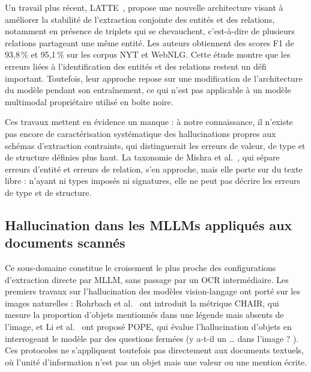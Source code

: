 Un travail plus récent, LATTE~\cite{zhang2026latte}, propose une nouvelle architecture visant à améliorer la stabilité de l'extraction conjointe des entités et des relations, notamment en présence de triplets qui se chevauchent, c'est-à-dire de plusieurs relations partageant une même entité. Les auteurs obtiennent des scores F1 de 93,8\,\% et 95,1\,\% sur les corpus NYT et WebNLG. Cette étude montre que les erreurs liées à l'identification des entités et des relations restent un défi important. Toutefois, leur approche repose sur une modification de l'architecture du modèle pendant son entraînement, ce qui n'est pas applicable à un modèle multimodal propriétaire utilisé en boîte noire.

Ces travaux mettent en évidence un manque : à notre connaissance, il n'existe pas encore de caractérisation systématique des hallucinations propres aux schémas d'extraction contraints, qui distinguerait les erreurs de valeur, de type et de structure définies plus haut. La taxonomie de Mishra et al.~\cite{mishra2024fava}, qui sépare erreurs d'entité et erreurs de relation, s'en approche, mais elle porte sur du texte libre : n'ayant ni types imposés ni signatures, elle ne peut pas décrire les erreurs de type et de structure.

\subsection{Hallucination dans les MLLMs appliqués aux documents scannés}

Ce sous-domaine constitue le croisement le plus proche des configurations d'extraction directe par MLLM, sans passage par un OCR intermédiaire. Les premiers travaux sur l'hallucination des modèles vision-langage ont porté sur les images naturelles : Rohrbach et al.~\cite{rohrbach2018chair} ont introduit la métrique CHAIR, qui mesure la proportion d'objets mentionnés dans une légende mais absents de l'image, et Li et al.~\cite{li2023pope} ont proposé POPE, qui évalue l'hallucination d'objets en interrogeant le modèle par des questions fermées (\og y a-t-il un \ldots{} dans l'image ? \fg{}). Ces protocoles ne s'appliquent toutefois pas directement aux documents textuels, où l'unité d'information n'est pas un objet mais une valeur ou une mention écrite.

